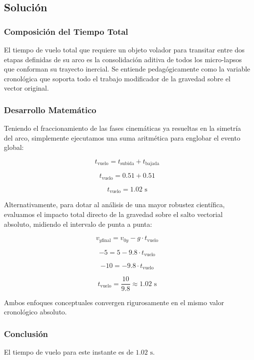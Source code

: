 \documentclass[12pt, a4paper]{article}
\begin{document}
\subsection*{Solución}

\subsubsection*{Composición del Tiempo Total}

El tiempo de vuelo total que requiere un objeto volador para transitar entre dos etapas definidas de su arco es la consolidación aditiva de todos los micro-lapsos que conforman su trayecto inercial. Se entiende pedagógicamente como la variable cronológica que soporta todo el trabajo modificador de la gravedad sobre el vector original.

\subsubsection*{Desarrollo Matemático}

Teniendo el fraccionamiento de las fases cinemáticas ya resueltas en la simetría del arco, simplemente ejecutamos una suma aritmética para englobar el evento global:

$$t_{\text{vuelo}} = t_{\text{subida}} + t_{\text{bajada}}$$

$$t_{\text{vuelo}} = 0.51 + 0.51$$

$$t_{\text{vuelo}} = 1.02 \text{ s}$$

Alternativamente, para dotar al análisis de una mayor robustez científica, evaluamos el impacto total directo de la gravedad sobre el salto vectorial absoluto, midiendo el intervalo de punta a punta:

$$v_{y\text{final}} = v_{0y} - g \cdot t_{\text{vuelo}}$$

$$-5 = 5 - 9.8 \cdot t_{\text{vuelo}}$$

$$-10 = -9.8 \cdot t_{\text{vuelo}}$$

$$t_{\text{vuelo}} = \frac{10}{9.8} \approx 1.02 \text{ s}$$

Ambos enfoques conceptuales convergen rigurosamente en el mismo valor cronológico absoluto.

\subsubsection*{Conclusión}

El tiempo de vuelo para este instante es de $1.02 \text{ s}$.
\end{document}
